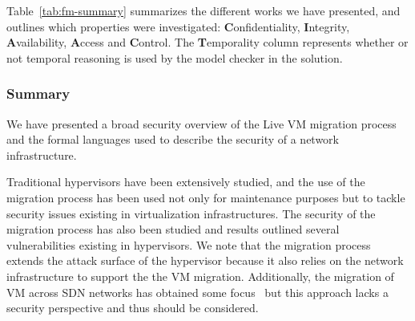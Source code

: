 Table~\ref{tab:fm-summary} summarizes the different works we have presented, and outlines which properties were investigated: \textbf{C}onfidentiality, \textbf{I}ntegrity, \textbf{A}vailability, \textbf{A}ccess and \textbf{C}ontrol. 
The \textbf{T}emporality column represents whether or not temporal reasoning is used by the model checker in the solution.
\begin{table}[ht]
\caption{Summary of formal models}
\label{tab:fm-summary}
\end{table}

\subsubsection{Summary}
We have presented a broad security overview of the Live VM migration process and the formal languages used to describe the security of a network infrastructure.

Traditional hypervisors have been extensively studied, and the use of the migration process has been used not only for maintenance purposes but to tackle security issues existing in virtualization infrastructures.
The security of the migration process has also been studied and results outlined several vulnerabilities existing in hypervisors.
We note that the migration process extends the attack surface of the hypervisor because it also relies on the network infrastructure to support the the VM migration.
Additionally, the migration of VM across SDN networks has obtained some focus~\cite{Datacenters2014,Lin2013,Ibn-Khedher2015} but this approach lacks a security perspective and thus should be considered.

